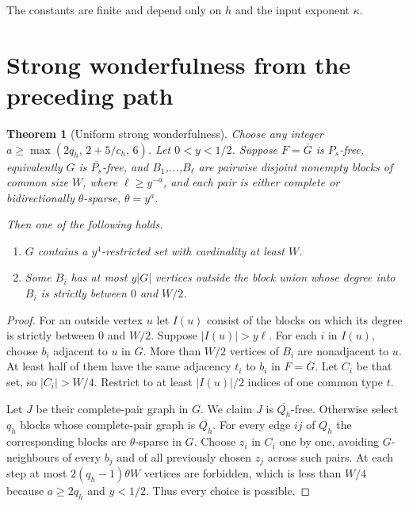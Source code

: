 \documentclass[11pt,a4paper]{article}
\newtheorem{theorem}{Theorem}[section]
\theoremstyle{definition}
\theoremstyle{remark}
\numberwithin{equation}{section}
\begin{document}
The constants are finite and depend only on \(h\) and the input exponent \(\kappa\).

\section{Strong wonderfulness from the preceding path}\label{sec:wonder}
\begin{theorem}[Uniform strong wonderfulness]\label{thm:wonder}
Choose any integer \(a\ge \max (2 q_{h},\, 2+5/c_{h},\, 6)\). Let \(0<y<1/2\). Suppose \(F=\overline G\) is \(P_s\)-free, equivalently \(G\) is \(\overline{P_s}\)-free, and \(B_{1}\),...,\(B_{\ell}\) are pairwise disjoint nonempty blocks of common size \(W\), where \(\ell\ge\allowbreak y^{-a}\), and each pair is either complete or bidirectionally \(\theta\)-sparse, \(\theta=y^{a}\).

Then one of the following holds.
\begin{enumerate}[label=(\Alph*)]
\item \(G\) contains a \(y^{4}\)-restricted set with cardinality at least \(W\).
\item Some \(B_{i}\) has at most \(y|G|\) vertices outside the block union whose degree into \(B_{i}\) is strictly between \(0\) and \(W/2\).
\end{enumerate}
\end{theorem}\begin{proof}
For an outside vertex \(u\) let \(I(u)\) consist of the blocks on which its degree is strictly between \(0\) and \(W/2\). Suppose \(|I(u)|>y \ell\). For each \(i\) in \(I(u)\), choose \(b_{i}\) adjacent to \(u\) in \(G\). More than \(W/2\) vertices of \(B_{i}\) are nonadjacent to \(u\). At least half of them have the same adjacency \(t_{i}\) to \(b_{i}\) in \(F=\overline{G}\). Let \(C_{i}\) be that set, so \(|C_{i}|>W/4\). Restrict to at least \(|I(u)|/2\) indices of one common type \(t\).

Let \(J\) be their complete-pair graph in \(G\). We claim \(J\) is \(\overline{Q_{h}}\)-free. Otherwise select \(q_{h}\) blocks whose complete-pair graph is \(\overline{Q_{h}}\). For every edge \(ij\) of \(Q_{h}\) the corresponding blocks are \(\theta\)-sparse in \(G\). Choose \(z_{i}\) in \(C_{i}\) one by one, avoiding \(G\)-neighbours of every \(b_{j}\) and of all previously chosen \(z_{j}\) across such pairs. At each step at most \(2(q_{h}-1)\theta W\) vertices are forbidden, which is less than \(W/4\) because \(a\ge\allowbreak 2q_{h}\) and \(y<1/2\). Thus every choice is possible.


\end{proof}
\end{document}
